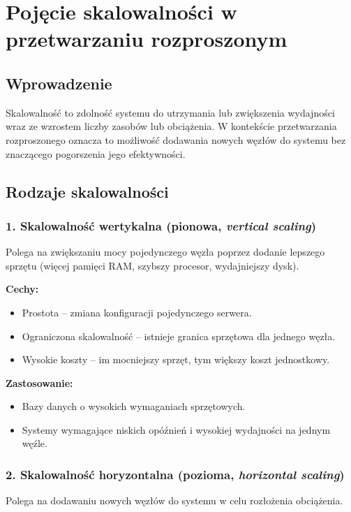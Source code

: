 \section{Pojęcie skalowalności w przetwarzaniu rozproszonym}

\subsection{Wprowadzenie}
Skalowalność to zdolność systemu do utrzymania lub zwiększenia wydajności wraz ze wzrostem liczby zasobów lub obciążenia. W kontekście przetwarzania rozproszonego oznacza to możliwość dodawania nowych węzłów do systemu bez znaczącego pogorszenia jego efektywności.

\subsection{Rodzaje skalowalności}

\subsubsection{1. Skalowalność wertykalna (pionowa, \textit{vertical scaling})}
Polega na zwiększaniu mocy pojedynczego węzła poprzez dodanie lepszego sprzętu (więcej pamięci RAM, szybszy procesor, wydajniejszy dysk).

\textbf{Cechy:}
\begin{itemize}
    \item Prostota – zmiana konfiguracji pojedynczego serwera.
    \item Ograniczona skalowalność – istnieje granica sprzętowa dla jednego węzła.
    \item Wysokie koszty – im mocniejszy sprzęt, tym większy koszt jednostkowy.
\end{itemize}

\textbf{Zastosowanie:}
\begin{itemize}
    \item Bazy danych o wysokich wymaganiach sprzętowych.
    \item Systemy wymagające niskich opóźnień i wysokiej wydajności na jednym węźle.
\end{itemize}

\subsubsection{2. Skalowalność horyzontalna (pozioma, \textit{horizontal scaling})}
Polega na dodawaniu nowych węzłów do systemu w celu rozłożenia obciążenia.

